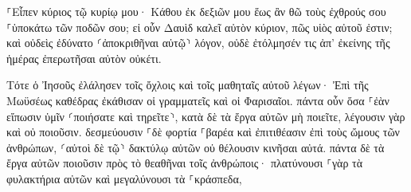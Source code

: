 \documentclass{openreader}
\begin{document}
⸀Εἶπεν κύριος τῷ κυρίῳ μου· Κάθου ἐκ δεξιῶν μου ἕως ἂν θῶ τοὺς ἐχθρούς σου ⸀ὑποκάτω τῶν ποδῶν σου; 
εἰ οὖν Δαυὶδ καλεῖ αὐτὸν κύριον, πῶς υἱὸς αὐτοῦ ἐστιν; 
καὶ οὐδεὶς ἐδύνατο ⸂ἀποκριθῆναι αὐτῷ⸃ λόγον, οὐδὲ ἐτόλμησέν τις ἀπ’ ἐκείνης τῆς ἡμέρας ἐπερωτῆσαι αὐτὸν οὐκέτι. 

Τότε ὁ Ἰησοῦς ἐλάλησεν τοῖς ὄχλοις καὶ τοῖς μαθηταῖς αὐτοῦ 
λέγων· Ἐπὶ τῆς Μωϋσέως καθέδρας ἐκάθισαν οἱ γραμματεῖς καὶ οἱ Φαρισαῖοι. 
πάντα οὖν ὅσα ⸀ἐὰν εἴπωσιν ὑμῖν ⸂ποιήσατε καὶ τηρεῖτε⸃, κατὰ δὲ τὰ ἔργα αὐτῶν μὴ ποιεῖτε, λέγουσιν γὰρ καὶ οὐ ποιοῦσιν. 
δεσμεύουσιν ⸀δὲ φορτία ⸀βαρέα καὶ ἐπιτιθέασιν ἐπὶ τοὺς ὤμους τῶν ἀνθρώπων, ⸂αὐτοὶ δὲ τῷ⸃ δακτύλῳ αὐτῶν οὐ θέλουσιν κινῆσαι αὐτά. 
πάντα δὲ τὰ ἔργα αὐτῶν ποιοῦσιν πρὸς τὸ θεαθῆναι τοῖς ἀνθρώποις· πλατύνουσι ⸀γὰρ τὰ φυλακτήρια αὐτῶν καὶ μεγαλύνουσι τὰ ⸀κράσπεδα, 
\end{document}
